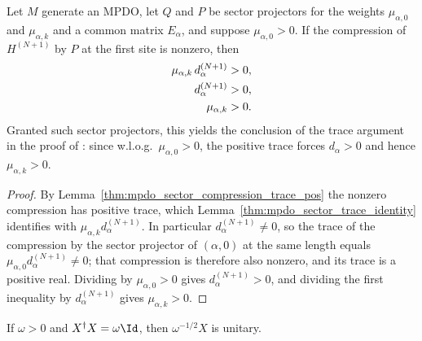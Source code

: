 \begin{lemma}
    \label{thm:mpdo_sector_weight_pos}
    \leanok
    Let $M$ generate an MPDO, let $Q$ and $P$ be sector projectors for the
    weights $\mu_{\alpha,0}$ and $\mu_{\alpha,k}$ and a common matrix
    $E_\alpha$, and suppose $\mu_{\alpha,0}>0$. If the compression of
    $H^{(N+1)}$ by $P$ at the first site is nonzero, then
    \begin{align}
        \mu_{\alpha,k}\,d_\alpha^{(N+1)} & >0,
        \notag                                 \\
        d_\alpha^{(N+1)}                 & >0,
        \notag                                 \\
        \mu_{\alpha,k}                   & >0.
        \notag
    \end{align}
    Granted such sector projectors, this yields the conclusion of the trace
    argument in the proof of
    \cite[Proposition~4.13]{Cirac2016MPDO_arXiv}: since w.l.o.g.\
    $\mu_{\alpha,0}>0$, the positive trace forces $d_\alpha>0$ and hence
    $\mu_{\alpha,k}>0$.
\end{lemma}

\begin{proof}\leanok
    By Lemma~\ref{thm:mpdo_sector_compression_trace_pos} the nonzero
    compression has positive trace, which
    Lemma~\ref{thm:mpdo_sector_trace_identity} identifies with
    $\mu_{\alpha,k}d_\alpha^{(N+1)}$. In particular
    $d_\alpha^{(N+1)}\ne 0$, so the trace of the compression by the sector
    projector of $(\alpha,0)$ at the same length equals
    $\mu_{\alpha,0}d_\alpha^{(N+1)}\ne 0$; that compression is therefore
    also nonzero, and its trace is a positive real. Dividing by
    $\mu_{\alpha,0}>0$ gives $d_\alpha^{(N+1)}>0$, and dividing the first
    inequality by $d_\alpha^{(N+1)}$ gives $\mu_{\alpha,k}>0$.
\end{proof}

\begin{lemma}
    \label{thm:normalize_scalar_gram_matrix}
    \leanok
    If $\omega>0$ and $X^\dagger X=\omega\Id$, then
    $\omega^{-1/2}X$ is unitary.
\end{lemma}

